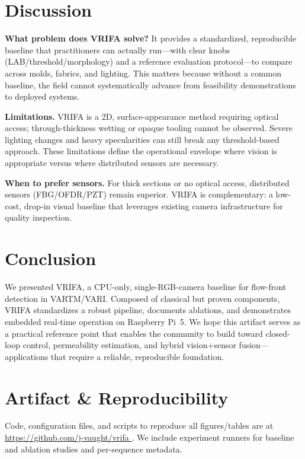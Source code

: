 \documentclass[twocolumn, 10pt]{article}
\begin{document}
\section{Discussion}
\textbf{What problem does VRIFA solve?} It provides a standardized, reproducible baseline that practitioners can actually run—with clear knobs (LAB/threshold/morphology) and a reference evaluation protocol—to compare across molds, fabrics, and lighting. This matters because without a common baseline, the field cannot systematically advance from feasibility demonstrations to deployed systems.

\textbf{Limitations.} VRIFA is a 2D, surface-appearance method requiring optical access; through-thickness wetting or opaque tooling cannot be observed. Severe lighting changes and heavy specularities can still break any threshold-based approach. These limitations define the operational envelope where vision is appropriate versus where distributed sensors are necessary.

\textbf{When to prefer sensors.} For thick sections or no optical access, distributed sensors (FBG/OFDR/PZT) remain superior. VRIFA is complementary: a low-cost, drop-in visual baseline that leverages existing camera infrastructure for quality inspection.

\section{Conclusion}
We presented VRIFA, a CPU-only, single-RGB-camera baseline for flow-front detection in VARTM/VARI. Composed of classical but proven components, VRIFA standardizes a robust pipeline, documents ablations, and demonstrates embedded real-time operation on Raspberry Pi~5. We hope this artifact serves as a practical reference point that enables the community to build toward closed-loop control, permeability estimation, and hybrid vision+sensor fusion—applications that require a reliable, reproducible foundation.

\section*{Artifact \& Reproducibility}
Code, configuration files, and scripts to reproduce all figures/tables are at \url{https://github.com/j-vaught/vrifa }. We include experiment runners for baseline and ablation studies and per-sequence metadata.

\appendices
\end{document}
